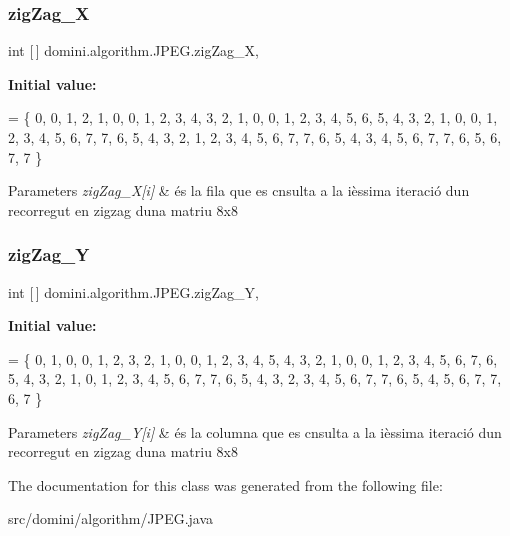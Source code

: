 \subsubsection{\texorpdfstring{zig\+Zag\+\_\+X}{zigZag\_X}}
{\footnotesize\ttfamily int \mbox{[}$\,$\mbox{]} domini.\+algorithm.\+J\+P\+E\+G.\+zig\+Zag\+\_\+X\hspace{0.3cm}{\ttfamily [static]}, {\ttfamily [private]}}

{\bfseries Initial value\+:}
\begin{DoxyCode}
= \{
        0,
        0, 1,
        2, 1, 0,
        0, 1, 2, 3, 
        4, 3, 2, 1, 0,
        0, 1, 2, 3, 4, 5,
        6, 5, 4, 3, 2, 1, 0,
        0, 1, 2, 3, 4, 5, 6, 7,
        7, 6, 5, 4, 3, 2, 1,
        2, 3, 4, 5, 6, 7,
        7, 6, 5, 4, 3,
        4, 5, 6, 7, 
        7, 6, 5,
        6, 7,
        7
    \}
\end{DoxyCode}

\begin{DoxyParams}{Parameters}
{\em zig\+Zag\+\_\+\+X\mbox{[}i\mbox{]}} & és la fila que es cnsulta a la ièssima iteració d\textquotesingle{}un recorregut en zigzag d\textquotesingle{}una matriu 8x8 \\
\hline
\end{DoxyParams}
\mbox{\label{classdomini_1_1algorithm_1_1JPEG_ad886d8aa00a40cb151b446534f0d1bcc}} 
\subsubsection{\texorpdfstring{zig\+Zag\+\_\+Y}{zigZag\_Y}}
{\footnotesize\ttfamily int \mbox{[}$\,$\mbox{]} domini.\+algorithm.\+J\+P\+E\+G.\+zig\+Zag\+\_\+Y\hspace{0.3cm}{\ttfamily [static]}, {\ttfamily [private]}}

{\bfseries Initial value\+:}
\begin{DoxyCode}
= \{
        0,
        1, 0,
        0, 1, 2,
        3, 2, 1, 0,
        0, 1, 2, 3, 4,
        5, 4, 3, 2, 1, 0,
        0, 1, 2, 3, 4, 5, 6,
        7, 6, 5, 4, 3, 2, 1, 0,
        1, 2, 3, 4, 5, 6, 7,
        7, 6, 5, 4, 3, 2,
        3, 4, 5, 6, 7,
        7, 6, 5, 4,
        5, 6, 7,
        7, 6,
        7
    \}
\end{DoxyCode}

\begin{DoxyParams}{Parameters}
{\em zig\+Zag\+\_\+\+Y\mbox{[}i\mbox{]}} & és la columna que es cnsulta a la ièssima iteració d\textquotesingle{}un recorregut en zigzag d\textquotesingle{}una matriu 8x8 \\
\hline
\end{DoxyParams}


The documentation for this class was generated from the following file\+:\begin{DoxyCompactItemize}
\item 
src/domini/algorithm/J\+P\+E\+G.\+java\end{DoxyCompactItemize}
